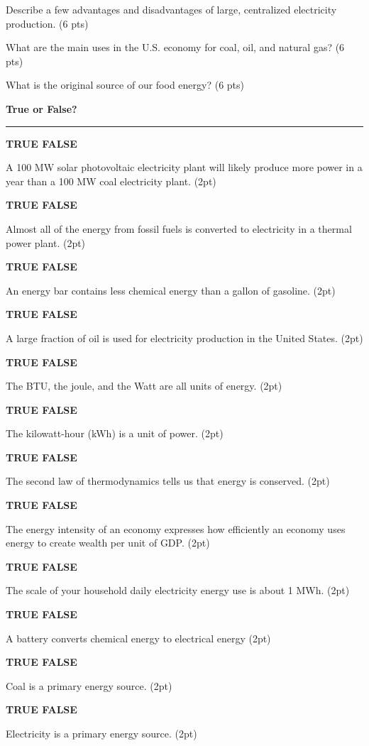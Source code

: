 \documentclass[12pt, oneside]{article}
\newif\ifsolution
\newcommand{\tf}[1]
{
\vfill
\parbox[t]{0.25\textwidth}{\bf TRUE \hspace{0.1 in} FALSE }
\parbox[t]{0.75\textwidth}{#1 (2pt)}
}
\newcommand{\chead}[1]
{\begin{center}\large\textbf{#1}\end{center}
\hrule
\vspace{10pt}}
\newcommand{\solution}[1]
{\ifsolution
Answer: {\it #1}
\else\fi}
\begin{document}
\solution{Solar PV electricity creates direct current electricity
without a  thermal cycle while solar thermal electricity uses technology
Rankine cycle steam turbines to generate AC electricity.}

\vfill

Describe a few advantages and disadvantages of large, centralized
electricity production. (6 pts)

\solution{Advantages include economies of scale that make larger plants
more cost effective.  Disadvantages include large investments, large
effect from individual plant failures, and
transmission costs.}

\vfill

What are the main uses in the U.S. economy for coal, oil, and natural gas? (6 pts)

\solution{Coal is mostly used for electricity production, oil is mostly
used for transportation, natural gas has many uses including
electricity, heating, and transportation.}

\vfill

What is the original source of our food energy? (6 pts)

\solution{The chemical energy in our food was originally radiation
energy from the sun which was converted to chemical energy by plants.
Depending on your diet, you may also consume organisms that consumed
plants.  Bonus if you mention the nuclear energy from the sun.}

\vfill


\newpage
\chead{True or False?}

\tf{A 100 MW solar photovoltaic electricity plant will likely produce
more power in a year than a 100 MW coal electricity plant.}
\solution{False}

\tf{Almost all of the energy from fossil fuels is converted to
electricity in a thermal power plant.}
\solution{False}

\tf{An energy bar contains less chemical energy than a gallon of
gasoline.}
\solution{True}

\tf{A large fraction of oil is used for electricity production in the
United States.}
\solution{False}

\tf{The BTU, the joule, and the Watt are all units of energy.}
\solution{False}

\tf{The kilowatt-hour (kWh) is a unit of power.}
\solution{False}

\tf{The second law of thermodynamics tells us that energy is conserved.}
\solution{False}

\tf{The energy intensity of an economy expresses how efficiently an
economy uses energy to create wealth per unit of GDP.}
\solution{True}

\tf{The scale of your household daily electricity energy use is about 1 MWh.}
\solution{False}

\tf{A battery converts chemical energy to electrical energy}
\solution{True}

\tf{Coal is a primary energy source.}
\solution{True}

\tf{Electricity is a primary energy source.}
\solution{False}
\end{document}
